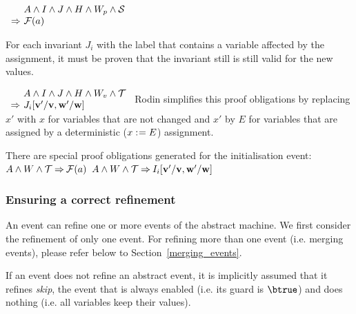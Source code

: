   {$\begin{array}{r@{\ }l}
      & A \land I \land J \land H \land W_p \land \absbeforeafter \\
      \limp & \actfis(a)
    \end{array}$}

For each invariant $J_i$ with the label  
  that contains a variable affected by the assignment, it must be proven
  that the invariant still is still valid for the new values.

  {}%
  {$\begin{array}{r@{\ }l}
      & A \land I \land J \land H \land W_{v} \land \concbeforeafter \\
      \limp & J_i[\absvariables'/\absvariables,\concvariables'/\concvariables]
    \end{array}$}
  Rodin simplifies this proof obligations by replacing $x'$ with $x$ for variables that are not
  changed and $x'$ by $E$
  for variables that are assigned by a deterministic ($x \mathrel{:\mkern1mu=} E$) assignment.

There are special proof obligations generated for the initialisation event:
  {$A \land W \land \mathcal{T} \mathbin\Rightarrow  \mathcal{F}(a)$}
  {}%
  {$A \land W \land \mathcal{T} \mathbin\Rightarrow I_i[\mathbf{v}'/\mathbf{v},\mathbf{w}'/\mathbf{w}]$}

\subsubsection{Ensuring a correct refinement}
\label{refinement_proof_obligations}
An event can refine one or more events of the abstract machine.
We first consider the refinement of only one event. 
For refining more than one event (i.e. merging events), please refer below to Section~\ref{merging_events}.

If an event does not refine an abstract event, it is implicitly assumed that it refines \emph{skip}, the
  event that is always enabled (i.e. its guard is $\btrue$) and does nothing (i.e. all variables keep their
  values).

